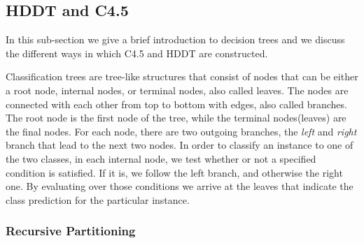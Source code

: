 \documentclass{acm_proc_article-sp}
\begin{document}


\subsection{HDDT and C4.5}

In this sub-section we give a brief introduction to decision trees and we discuss the different ways in which C4.5 and HDDT are constructed.

Classification trees are tree-like structures that consist of nodes that can be either a root node, internal nodes, or terminal nodes, also called leaves. The nodes are connected with each other from top to bottom with edges, also called branches. The root node is the first node of the tree, while the terminal nodes(leaves) are the final nodes. For each node, there are two outgoing branches, the \textit{left} and \textit{right} branch that lead to the next two nodes. In order to classify an instance to one of the two classes, in each internal node, we test whether or not a specified condition is satisfied. If it is, we follow the left branch, and otherwise the right one. By evaluating over those conditions we arrive at the leaves that indicate the class prediction for the particular instance. 

\subsubsection{Recursive Partitioning}
\end{document}
